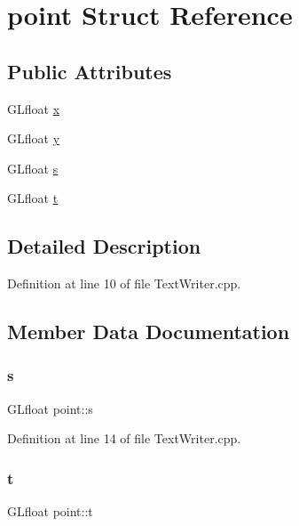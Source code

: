 \hypertarget{structpoint}{}\section{point Struct Reference}
\label{structpoint}
\subsection*{Public Attributes}
\begin{DoxyCompactItemize}
\item 
G\+Lfloat \hyperlink{structpoint_a1b897e15553a9e09f9c1f23c08772e7d}{x}
\item 
G\+Lfloat \hyperlink{structpoint_a69a95a7bade398cc34ba8e4bfd579132}{y}
\item 
G\+Lfloat \hyperlink{structpoint_a6ad5eb285e764443e9b9d84911d3ed8c}{s}
\item 
G\+Lfloat \hyperlink{structpoint_a77d3307ea9c59b3df6001703ea2f1582}{t}
\end{DoxyCompactItemize}


\subsection{Detailed Description}


Definition at line 10 of file Text\+Writer.\+cpp.



\subsection{Member Data Documentation}
\mbox{\label{structpoint_a6ad5eb285e764443e9b9d84911d3ed8c}} 
\subsubsection{\texorpdfstring{s}{s}}
{\footnotesize\ttfamily G\+Lfloat point\+::s}



Definition at line 14 of file Text\+Writer.\+cpp.

\mbox{\label{structpoint_a77d3307ea9c59b3df6001703ea2f1582}} 
\subsubsection{\texorpdfstring{t}{t}}
{\footnotesize\ttfamily G\+Lfloat point\+::t}



